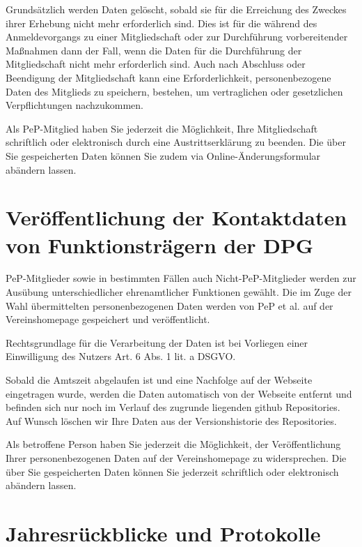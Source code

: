 \documentclass[
  fontsize=12pt,
  paper=a4,
  DIV14,
  parskip,
]{scrartcl}
\begin{document}
Grundsätzlich werden Daten gelöscht, sobald sie für die Erreichung des
Zweckes ihrer Erhebung nicht mehr erforderlich sind.
Dies ist für die während des Anmeldevorgangs zu einer Mitgliedschaft oder zur
Durchführung vorbereitender Maßnahmen dann der Fall, wenn die Daten für die
Durchführung der Mitgliedschaft nicht mehr erforderlich sind.
Auch nach Abschluss oder Beendigung der Mitgliedschaft kann eine
Erforderlichkeit, personenbezogene Daten des Mitglieds zu speichern,
bestehen, um vertraglichen oder gesetzlichen Verpflichtungen nachzukommen.

Als PeP-Mitglied haben Sie jederzeit die Möglichkeit, Ihre Mitgliedschaft
schriftlich oder elektronisch durch eine Austrittserklärung zu beenden.
Die über Sie gespeicherten Daten können Sie zudem via
Online-Änderungsformular abändern lassen.

\section{Veröffentlichung der Kontaktdaten von Funktionsträgern der DPG}

PeP-Mitglieder sowie in bestimmten Fällen auch Nicht-PeP-Mitglieder werden
zur Ausübung unterschiedlicher ehrenamtlicher Funktionen gewählt.
Die im Zuge der Wahl übermittelten personenbezogenen Daten werden von PeP et
al. auf der Vereinshomepage gespeichert und veröffentlicht.

Rechtsgrundlage für die Verarbeitung der Daten ist bei Vorliegen einer
Einwilligung des Nutzers Art. 6 Abs. 1 lit. a DSGVO.

Sobald die Amtszeit abgelaufen ist und eine Nachfolge auf der Webseite
eingetragen wurde, werden die Daten automatisch von der Webseite entfernt und
befinden sich nur noch im Verlauf des zugrunde liegenden github Repositories.
Auf Wunsch löschen wir Ihre Daten aus der Versionshistorie des Repositories.

Als betroffene Person haben Sie jederzeit die Möglichkeit, der
Veröffentlichung Ihrer personenbezogenen Daten auf der Vereinshomepage zu
widersprechen. Die über Sie gespeicherten Daten können Sie jederzeit
schriftlich oder elektronisch abändern lassen.

\section{Jahresrückblicke und Protokolle}
\end{document}
